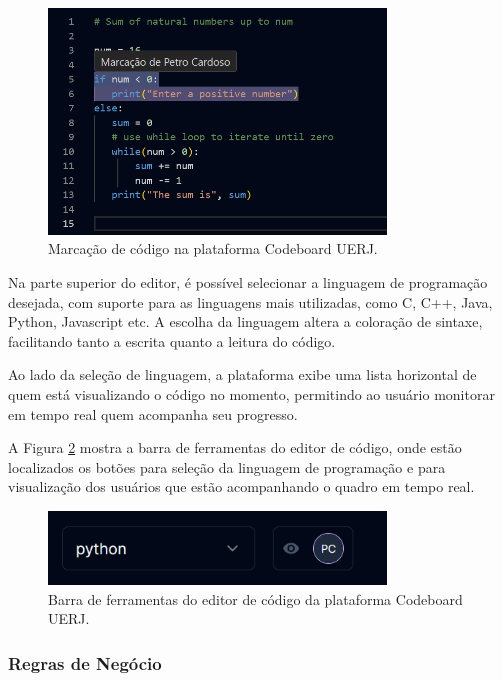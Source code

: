 \begin{figure}[H]
    \centering
    \includegraphics[width=0.8\textwidth]{assets/codeboard/code-editor-user-highlight.png}
    \caption{Marcação de código na plataforma Codeboard UERJ.}
    \label{fig:code-editor-user-highlight}
\end{figure}

Na parte superior do editor, é possível selecionar a linguagem de programação desejada, com suporte para as linguagens mais utilizadas, como C, C++, Java, Python, Javascript etc. A escolha da linguagem altera a coloração de sintaxe, facilitando tanto a escrita quanto a leitura do código. 

Ao lado da seleção de linguagem, a plataforma exibe uma lista horizontal de quem está visualizando o código no momento, permitindo ao usuário monitorar em tempo real quem acompanha seu progresso.

A Figura \ref{fig:code-editor-toolbar} mostra a barra de ferramentas do editor de código, onde estão localizados os botões para seleção da linguagem de programação e para visualização dos usuários que estão acompanhando o quadro em tempo real.

\begin{figure}[H]
    \centering
    \includegraphics[width=0.8\textwidth]{assets/codeboard/code-editor-toolbar.png}
    \caption{Barra de ferramentas do editor de código da plataforma Codeboard UERJ.}
    \label{fig:code-editor-toolbar}
\end{figure}


\subsubsection{Regras de Negócio}

